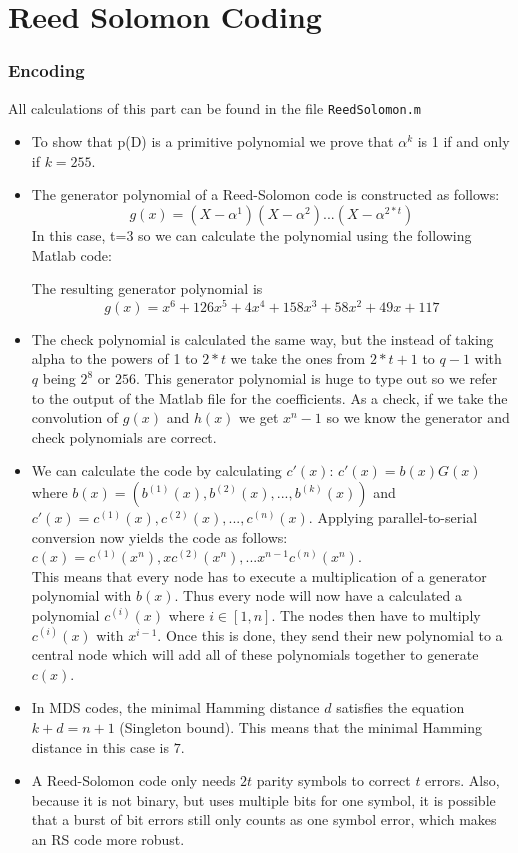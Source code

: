\documentclass[12pt,a4paper,oneside]{article}
\begin{document}
\section{Reed Solomon Coding}
\subsubsection*{Encoding}
All calculations of this part can be found in the file \verb|ReedSolomon.m|
\begin{itemize}
	\item To show that p(D) is a primitive polynomial we prove that $\alpha^k$ is 1 if and only if $k=255$. 
	
	\item The generator polynomial of a Reed-Solomon code is constructed as follows: \\
		\begin{equation*}
			g(x) = (X-\alpha^1)(X-\alpha^2)...(X-\alpha^{2*t})
		\end{equation*}
		In this case, t=3 so we can calculate the polynomial using the following Matlab code:
		
		The resulting generator polynomial is
		\begin{equation*}
			g(x) = x^6 + 126x^5 + 4x^4 + 158x^3 + 58x^2 + 49x + 117
		\end{equation*}
	\item The check polynomial is calculated the same way, but the instead of taking alpha to the powers of 1 to $2*t$ we take the ones from $2*t+1$ to $q-1$ with $q$ being $2^8$ or $256$. 
	This generator polynomial is huge to type out so we refer to the output of the Matlab file for the coefficients. As a check, if we take the convolution of $g(x)$ and $h(x)$ we get $x^n -1$ so we know the generator and check polynomials are correct.
	\item We can calculate the code by calculating $c'(x)$: $c'(x) = b(x)G(x)$ where $b(x) = (b^{(1)}(x),b^{(2)}(x),...,b^{(k)}(x))$ and $c'(x) = c^{(1)}(x),c^{(2)}(x),...,c^{(n)}(x)$. Applying parallel-to-serial conversion now yields the code as follows: $c(x) = c^{(1)}(x^n),xc^{(2)}(x^n),...x^{n-1}c^{(n)}(x^n)$.\\
	This means that every node has to execute a multiplication of a generator polynomial with $b(x)$. Thus every node will now have a calculated a polynomial $c^{(i)}(x)$ where $i \in [1,n]$. The nodes then have to multiply $c^{(i)}(x)$ with $x^{i-1}$. Once this is done, they send their new polynomial to a central node which will add all of these polynomials together to generate $c(x)$.
	\item In MDS codes, the minimal Hamming distance $d$ satisfies the equation $k + d = n + 1$ (Singleton bound). This means that the minimal Hamming distance in this case is $7$.
	\item A Reed-Solomon code only needs $2t$ parity symbols to correct $t$ errors. Also, because it is not binary, but uses multiple bits for one symbol, it is possible that a burst of bit errors still only counts as one symbol error, which makes an RS code more robust.
	

\end{itemize}
\end{document}
